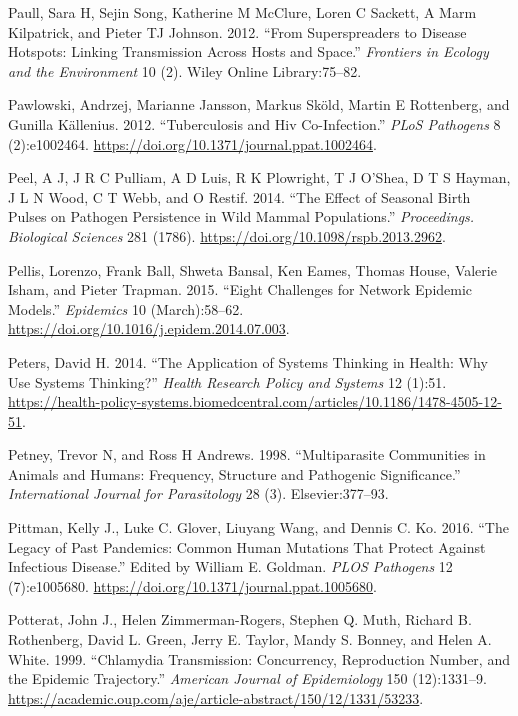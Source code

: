 \documentclass[]{book}
\theoremstyle{definition}
\theoremstyle{definition}
\theoremstyle{definition}
\theoremstyle{remark}
\begin{document}
\leavevmode\hypertarget{ref-paull12}{}%
Paull, Sara H, Sejin Song, Katherine M McClure, Loren C Sackett, A Marm
Kilpatrick, and Pieter TJ Johnson. 2012. ``From Superspreaders to
Disease Hotspots: Linking Transmission Across Hosts and Space.''
\emph{Frontiers in Ecology and the Environment} 10 (2). Wiley Online
Library:75--82.

\leavevmode\hypertarget{ref-pawlowski12}{}%
Pawlowski, Andrzej, Marianne Jansson, Markus Sköld, Martin E Rottenberg,
and Gunilla Källenius. 2012. ``Tuberculosis and Hiv Co-Infection.''
\emph{PLoS Pathogens} 8 (2):e1002464.
\url{https://doi.org/10.1371/journal.ppat.1002464}.

\leavevmode\hypertarget{ref-peel14}{}%
Peel, A J, J R C Pulliam, A D Luis, R K Plowright, T J O'Shea, D T S
Hayman, J L N Wood, C T Webb, and O Restif. 2014. ``The Effect of
Seasonal Birth Pulses on Pathogen Persistence in Wild Mammal
Populations.'' \emph{Proceedings. Biological Sciences} 281 (1786).
\url{https://doi.org/10.1098/rspb.2013.2962}.

\leavevmode\hypertarget{ref-pellis15}{}%
Pellis, Lorenzo, Frank Ball, Shweta Bansal, Ken Eames, Thomas House,
Valerie Isham, and Pieter Trapman. 2015. ``Eight Challenges for Network
Epidemic Models.'' \emph{Epidemics} 10 (March):58--62.
\url{https://doi.org/10.1016/j.epidem.2014.07.003}.

\leavevmode\hypertarget{ref-peters14}{}%
Peters, David H. 2014. ``The Application of Systems Thinking in Health:
Why Use Systems Thinking?'' \emph{Health Research Policy and Systems} 12
(1):51.
\url{https://health-policy-systems.biomedcentral.com/articles/10.1186/1478-4505-12-51}.

\leavevmode\hypertarget{ref-petney98}{}%
Petney, Trevor N, and Ross H Andrews. 1998. ``Multiparasite Communities
in Animals and Humans: Frequency, Structure and Pathogenic
Significance.'' \emph{International Journal for Parasitology} 28 (3).
Elsevier:377--93.

\leavevmode\hypertarget{ref-pittman16}{}%
Pittman, Kelly J., Luke C. Glover, Liuyang Wang, and Dennis C. Ko. 2016.
``The Legacy of Past Pandemics: Common Human Mutations That Protect
Against Infectious Disease.'' Edited by William E. Goldman. \emph{PLOS
Pathogens} 12 (7):e1005680.
\url{https://doi.org/10.1371/journal.ppat.1005680}.

\leavevmode\hypertarget{ref-potterat99}{}%
Potterat, John J., Helen Zimmerman-Rogers, Stephen Q. Muth, Richard B.
Rothenberg, David L. Green, Jerry E. Taylor, Mandy S. Bonney, and Helen
A. White. 1999. ``Chlamydia Transmission: Concurrency, Reproduction
Number, and the Epidemic Trajectory.'' \emph{American Journal of
Epidemiology} 150 (12):1331--9.
\url{https://academic.oup.com/aje/article-abstract/150/12/1331/53233}.
\end{document}
